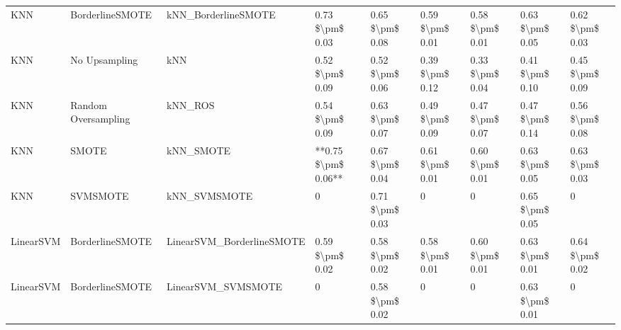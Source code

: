 \begin{tabular}{lllllllll}
                            KNN &               BorderlineSMOTE &                          kNN\_BorderlineSMOTE &     0.73 \$\textbackslash pm\$ 0.03 &           0.65 \$\textbackslash pm\$ 0.08 &       0.59 \$\textbackslash pm\$ 0.01 &        0.58 \$\textbackslash pm\$ 0.01 &                         0.63 \$\textbackslash pm\$ 0.05 &     0.62 \$\textbackslash pm\$ 0.03 \\
                            KNN &                 No Upsampling &                                          kNN &     0.52 \$\textbackslash pm\$ 0.09 &           0.52 \$\textbackslash pm\$ 0.06 &       0.39 \$\textbackslash pm\$ 0.12 &        0.33 \$\textbackslash pm\$ 0.04 &                         0.41 \$\textbackslash pm\$ 0.10 &     0.45 \$\textbackslash pm\$ 0.09 \\
                            KNN &           Random Oversampling &                                      kNN\_ROS &     0.54 \$\textbackslash pm\$ 0.09 &           0.63 \$\textbackslash pm\$ 0.07 &       0.49 \$\textbackslash pm\$ 0.09 &        0.47 \$\textbackslash pm\$ 0.07 &                         0.47 \$\textbackslash pm\$ 0.14 &     0.56 \$\textbackslash pm\$ 0.08 \\
                            KNN &                         SMOTE &                                    kNN\_SMOTE & **0.75 \$\textbackslash pm\$ 0.06** &           0.67 \$\textbackslash pm\$ 0.04 &       0.61 \$\textbackslash pm\$ 0.01 &        0.60 \$\textbackslash pm\$ 0.01 &                         0.63 \$\textbackslash pm\$ 0.05 &     0.63 \$\textbackslash pm\$ 0.03 \\
                            KNN &                      SVMSMOTE &                                 kNN\_SVMSMOTE &                   0 &           0.71 \$\textbackslash pm\$ 0.03 &                     0 &                      0 &                         0.65 \$\textbackslash pm\$ 0.05 &                   0 \\
                      LinearSVM &               BorderlineSMOTE &                    LinearSVM\_BorderlineSMOTE &     0.59 \$\textbackslash pm\$ 0.02 &           0.58 \$\textbackslash pm\$ 0.02 &       0.58 \$\textbackslash pm\$ 0.01 &        0.60 \$\textbackslash pm\$ 0.01 &                         0.63 \$\textbackslash pm\$ 0.01 &     0.64 \$\textbackslash pm\$ 0.02 \\
                      LinearSVM &               BorderlineSMOTE &                           LinearSVM\_SVMSMOTE &                   0 &           0.58 \$\textbackslash pm\$ 0.02 &                     0 &                      0 &                         0.63 \$\textbackslash pm\$ 0.01 &                   0 \\

\end{tabular}
